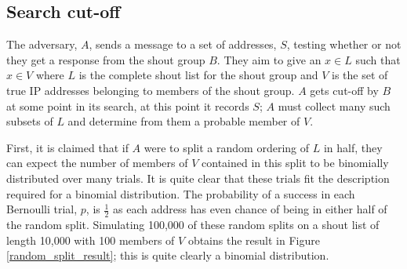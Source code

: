 \documentclass[ %
                    author={Luke Murray},
                supervisor={Dr. Simon Hollis},
                     title={Shadow Peer-to-Peer Networks},
                  subtitle={},
                    degree={MEng},
                      year={2013} ]{thesis}
\begin{document}

\subsection{Search cut-off}

The adversary, $A$, sends a message to a set of addresses, $S$, testing whether or not they get a response from the shout group $B$. They aim to give an $x \in L$ such that $x \in V$ where $L$ is the complete shout list for the shout group and $V$ is the set of true IP addresses belonging to members of the shout group. $A$ gets cut-off by $B$ at some point in its search, at this point it records $S$; $A$ must collect many such subsets of $L$ and determine from them a probable member of $V$.

First, it is claimed that if $A$ were to split a random ordering of $L$ in half, they can expect the number of members of $V$ contained in this split to be binomially distributed over many trials. It is quite clear that these trials fit the description required for a binomial distribution. The probability of a success in each Bernoulli trial, $p$, is $\frac{1}{2}$ as each address has even chance of being in either half of the random split. Simulating 100,000 of these random splits on a shout list of length 10,000 with 100 members of $V$ obtains the result in Figure \ref{random_split_result}; this is quite clearly a binomial distribution. 
\end{document}
